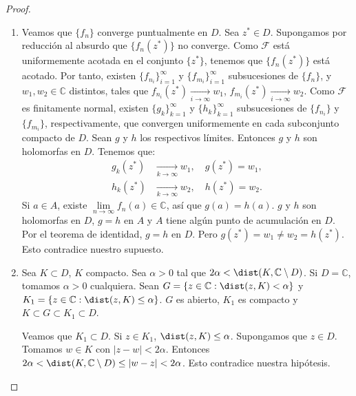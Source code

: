 \begin{proof}
    \hfill
    \begin{enumerate}
        \item Veamos que $\{f_n\}$ converge puntualmente en $D$.
              Sea $z^\ast \in D$.
              Supongamos por reducción al absurdo que $\{f_n(z^\ast)\}$ no converge.
              Como $\mathcal{F}$ está uniformemente acotada en el conjunto $\{z^\ast\}$, tenemos que $\{f_n(z^\ast)\}$ está acotado.
              Por tanto, existen $\{f_{n_i}\}_{i=1}^\infty$ y $\{f_{m_i}\}_{i=1}^\infty$ subsucesiones de $\{f_n\}$, y $w_1, w_2 \in \mathbb{C}$ distintos, tales que $f_{n_i}(z^\ast) \xrightarrow[i \to \infty]{} w_1$, $f_{m_i}(z^\ast) \xrightarrow[i \to \infty]{} w_2$.
              Como $\mathcal{F}$ es finitamente normal, existen $\{g_k\}_{k=1}^\infty$ y $\{h_k\}_{k=1}^\infty$ subsucesiones de $\{f_{n_i}\}$ y $\{f_{m_i}\}$, respectivamente, que convergen uniformemente en cada subconjunto compacto de $D$.
              Sean $g$ y $h$ los respectivos límites.
              Entonces $g$ y $h$ son holomorfas en $D$.
              Tenemos que:
              \begin{align*}
                  g_k(z^\ast) & \xrightarrow[k \to \infty]{} w_1, \quad g(z^\ast) = w_1, \\
                  h_k(z^\ast) & \xrightarrow[k \to \infty]{} w_2, \quad h(z^\ast) = w_2.
              \end{align*}
              Si $a \in A$, existe $\lim\limits_{n \to \infty} f_n(a) \in \mathbb{C}$, así que $g(a) = h(a)$.
              $g$ y $h$ son holomorfas en $D$, $g = h$ en $A$ y $A$ tiene algún punto de acumulación en $D$.
              Por el teorema de identidad, $g = h$ en $D$.
              Pero $g(z^\ast) = w_1 \neq w_2 = h(z^\ast)$.
              Esto contradice nuestro supuesto.

        \item Sea $K \subset D$, $K$ compacto.
              Sea $\alpha > 0$ tal que $2\alpha < \dist(K, \mathbb{C} \setminus D)$.
              Si $D = \mathbb{C}$, tomamos $\alpha > 0$ cualquiera.
              Sean $G = \{z \in \mathbb{C} : \dist(z, K) < \alpha\}$ y $K_1 = \{z \in \mathbb{C} : \dist(z, K) \leq \alpha\}$.
              $G$ es abierto, $K_1$ es compacto y $K \subset G \subset K_1 \subset D$.

              Veamos que $K_1 \subset D$.
              Si $z \in K_1$, $\dist(z, K) \leq \alpha$.
              Supongamos que $z \in D$.
              Tomamos $w \in K$ con $|z-w| < 2\alpha$.
              Entonces $2\alpha < \dist(K, \mathbb{C} \setminus D) \leq |w-z| < 2\alpha$.
              Esto contradice nuestra hipótesis.


\end{enumerate}
\end{proof}
